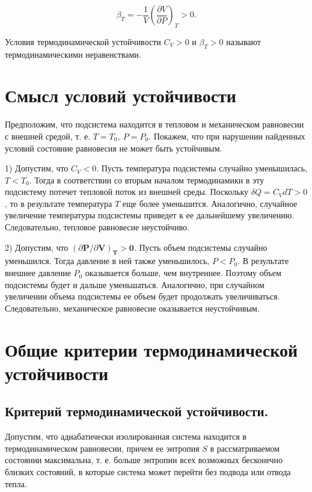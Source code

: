 \documentclass[a4paper,14pt]{article} %
\begin{document}
\begin{equation*}
	\beta_{T}=-\frac{1}{V}\left(\frac{\partial V}{\partial P}\right)_{T}>0.
\end{equation*}

Условия термодинамической устойчивости $C_V > 0$ и $\beta_{T} > 0$ называют 
термодинамическими неравенствами.

\section{Смысл условий устойчивости}

\hskip 5mm Предположим, что подсистема находится в тепловом и механическом равновесии с внешней средой, т. е. $T=T_{0},\ P=P_{0} .$ Покажем, что при нарушении найденных условий состояние равновесия не может быть устойчивым.

1) Допустим, что $C_{V}<0 .$ Пусть температура подсистемы случайно уменышилась, $T<T_{0} .$ Тогда в соответствии со вторым началом термодинамики в эту подсистему потечет тепловой поток из внешней среды. Поскольку $\delta Q=C_{V} d T>0$, то в результате температура $T$ еще более уменьшится. Аналогично, случайное увеличение температуры подсистемы приведет к ее дальнейшему увеличению. Следовательно, тепловое равновесие неустойчиво.

2) Допустим, что $(\partial \boldsymbol{P} / \partial \boldsymbol{V})_{\boldsymbol{T}}>\mathbf{0 .}$ Пусть объем подсистемы случайно уменьшился. Тогда давление в ней также уменьшилось, $P<P_{0} .$ В результате внешнее давление $P_{0}$ оказывается больше, чем внутреннее. Поэтому объем подсистемы будет и дальше уменьшаться. Аналогично, при случайном увеличении объема подсистемы ее объем будет продолжать увеличиваться. Следовательно, механическое равновесие оказывается неустойчивым.

\section{Общие критерии термодинамической устойчивости}

\subsection{Критерий термодинамической устойчивости.}

Допустим, что адиабатически изолированная система находится
в термодинамическом равновесии, причем ее энтропия $S$ в рассматриваемом состоянии максимальна, т. е. больше энтропии всех возможных бесконечно близких состояний, в которые система может перейти без подвода или отвода тепла. \\
\end{document}
